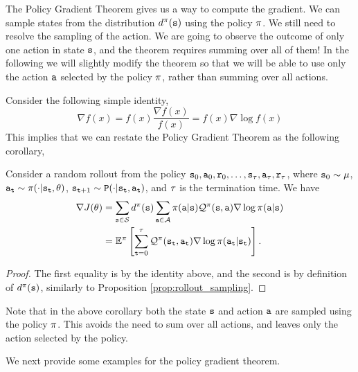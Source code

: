 The Policy Gradient Theorem gives us a way to compute the gradient.
We can sample states from the distribution $d^{\pi}({\tt s})$ using the
policy $\pi$. We still need to resolve the sampling of the
action. We are going to observe the outcome of only one action in
state ${\tt s}$, and the theorem requires summing over all of them!
In the following we will slightly modify the theorem so that we will
be able to use only the action ${\tt a}$ selected by the policy
$\pi$, rather than summing over all actions.

Consider the following simple identity,
\begin{equation}\label{eq:log_likelihood_trick}
\nabla f(x)=f(x)\frac{\nabla f(x)}{f(x)}=f(x)\nabla \log f(x)
\end{equation}
This implies that we can restate the Policy Gradient Theorem as the
following corollary,
\begin{corollary} 
\label{thm:policy-gradient-corr} Consider a random rollout from the policy ${\tt s}_0,{\tt a}_0,{\tt r}_0,\dots,{\tt s}_\tau, {\tt a}_\tau, {\tt r}_\tau$, where ${\tt s}_0 \sim \mu$, ${\tt a}_{\tt t}\sim \pi(\cdot|{\tt s}_{\tt t},\theta)$, ${\tt s}_{{\tt t}+1} \sim {\tt P} (\cdot | {\tt s}_{\tt t}, {\tt a}_{\tt t})$, and $\tau$ is the termination time. We have
\begin{equation*}
\begin{split}
\nabla J(\theta) &= \sum_{{\tt s} \in \mathcal{S}} d^{\pi}({\tt s}) \sum_{{\tt a}\in
\mathcal{A}} \pi({\tt a}|{\tt s}) \mathcal{Q}^\pi
({\tt s},{\tt a}) \nabla \log \pi({\tt a}|{\tt s}) \\
&=\mathbb{E}^\pi\left[\sum_{{\tt t}=0}^{\tau}\mathcal{Q}^\pi ({\tt s}_{\tt t},{\tt a}_{\tt t})\nabla \log
\pi({\tt a}_{\tt t}|{\tt s}_{\tt t})\right].    
\end{split}
\end{equation*}
\end{corollary}
\begin{proof}
    The first equality is by the identity above, and the second is by definition of $d^{\pi}({\tt s})$, similarly to Proposition \ref{prop:rollout_sampling}.
\end{proof}
Note that in the above corollary both the state ${\tt s}$ and action
${\tt a}$ are sampled using the policy $\pi$. This avoids the need to sum over all actions, and leaves only the action selected by the policy.

We next provide some examples for the policy gradient theorem.

